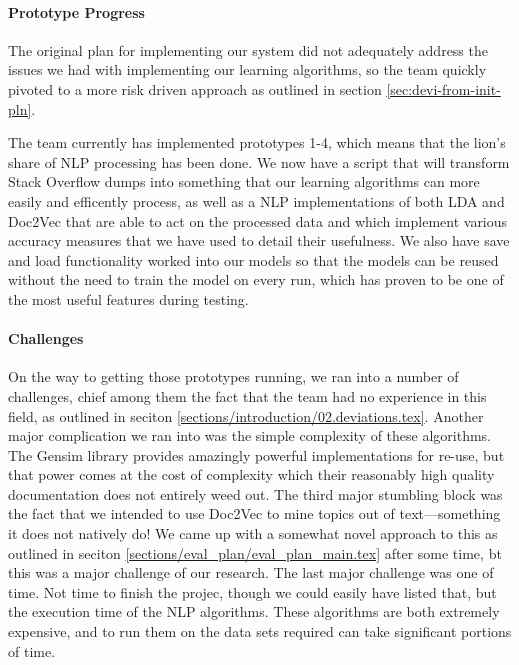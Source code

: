 
\paragraph{Prototype Progress}
The original plan for implementing our system did not adequately
address the issues we had with implementing our learning algorithms,
so the team quickly pivoted to a more risk driven approach as outlined
in section \ref{sec:devi-from-init-pln}.

The team currently has implemented prototypes 1-4, which means that
the lion's share of NLP processing has been done.
We now have a script that will transform Stack Overflow dumps into
something that our learning algorithms can more easily and efficently
process, as well as a NLP implementations of both LDA and Doc2Vec that
are able to act on the processed data and which implement various
accuracy measures that we have used to detail their usefulness.
We also have save and load functionality worked into our models so
that the models can be reused without the need to train the model on
every run, which has proven to be one of the most useful features
during testing.  


\paragraph{Challenges}
On the way to getting those prototypes running, we ran into a number
of challenges, chief among them the fact that the team had no
experience in this field, as outlined in seciton \ref{sections/introduction/02.deviations.tex}.
Another major complication we ran into was the simple complexity of
these algorithms.  The Gensim library provides amazingly powerful
implementations for re-use, but that power comes at the cost of
complexity which their reasonably high quality documentation does not
entirely weed out.
The third major stumbling block was the fact that we intended to use
Doc2Vec to mine topics out of text---something it does not natively
do!  
We came up with a somewhat novel approach to this as outlined in
seciton \ref{sections/eval_plan/eval_plan_main.tex} after some time,
bt this was a major challenge of our research.  
The last major challenge was one of time.
Not time to finish the projec, though we could easily have listed
that, but the execution time of the NLP algorithms.
These algorithms are both extremely expensive, and to run them on the
data sets required can take significant portions of time.


